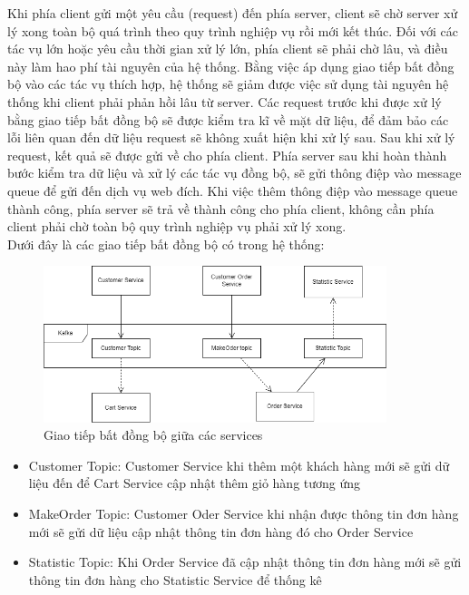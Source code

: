 \par Khi phía client gửi một yêu cầu (request) đến phía server, client sẽ chờ server xử lý xong toàn bộ quá trình theo quy trình nghiệp vụ rồi mới kết thúc. 
Đối với các tác vụ lớn hoặc yêu cầu thời gian xử lý lớn, phía client sẽ phải chờ lâu, và điều này làm hao phí tài nguyên của hệ thống. Bằng việc áp dụng giao tiếp bất đồng bộ vào các tác vụ thích hợp, hệ thống sẽ giảm được việc sử dụng tài nguyên hệ thống khi client phải phản hồi lâu từ server. 
Các request trước khi được xử lý bằng giao tiếp bất đồng bộ sẽ được kiểm tra kĩ về mặt dữ liệu, để đảm bảo các lỗi liên quan đến dữ liệu request sẽ không xuất hiện khi xử lý sau. Sau khi xử lý request, kết quả sẽ được gửi về cho phía client. 
Phía server sau khi hoàn thành bước kiểm tra dữ liệu và xử lý các tác vụ đồng bộ, sẽ gửi thông điệp vào message queue để gửi đến dịch vụ web đích. Khi việc thêm thông điệp vào message queue thành công, phía server sẽ trả về thành công cho phía client, không cần phía client phải chờ toàn bộ quy trình nghiệp vụ phải xử lý xong.\\

Dưới đây là các giao tiếp bất đồng bộ có trong hệ thống:

\begin{figure}[!htp]
	\centering
	\includegraphics[width=10cm]{img/Architecture/kafka.png}
	\newline
	\caption{Giao tiếp bất đồng bộ giữa các services}
\end{figure}

\begin{itemize}
	\item Customer Topic: Customer Service khi thêm một khách hàng mới sẽ gửi dữ liệu đến để Cart Service cập nhật thêm giỏ hàng tương ứng
	\item MakeOrder Topic: Customer Oder Service khi nhận được thông tin đơn hàng mới sẽ gửi dữ liệu cập nhật thông tin đơn hàng đó cho Order Service
	\item Statistic Topic: Khi Order Service đã cập nhật thông tin đơn hàng mới sẽ gửi thông tin đơn hàng cho Statistic Service để thống kê
\end{itemize}